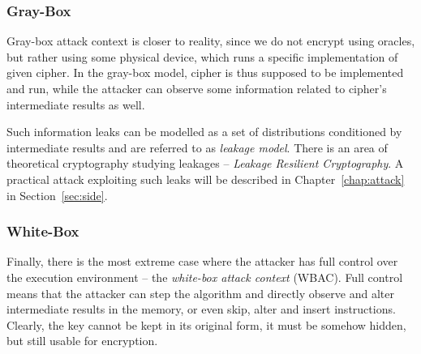 \subsubsection{Gray-Box}

Gray-box attack context is closer to reality, since we do not encrypt using oracles, but rather using some physical device, which runs a specific implementation of given cipher. In the gray-box model, cipher is thus supposed to be implemented and run, while the attacker can observe some information related to cipher's intermediate results as well.

Such information leaks can be modelled as a set of distributions conditioned by intermediate results and are referred to as {\em leakage model}. There is an area of theoretical cryptography studying leakages -- {\em Leakage Resilient Cryptography}. A practical attack exploiting such leaks will be described in Chapter~\ref{chap:attack} in Section~\ref{sec:side}.

\subsubsection{White-Box}

Finally, there is the most extreme case where the attacker has full control over the execution environment -- the {\em white-box attack context} (WBAC). Full control means that the attacker can step the algorithm and directly observe and alter intermediate results in the memory, or even skip, alter and insert instructions. Clearly, the key cannot be kept in its original form, it must be somehow hidden, but still usable for encryption.
